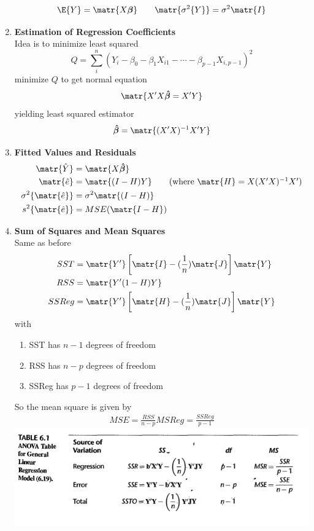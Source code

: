 \documentclass[11pt]{article}
\begin{document}
\begin{enumerate}
    \[
        \E\{Y\} =  \matr{X\boldsymbol{\beta}} \quad \quad \matr{\sigma^2\{Y\}} = \sigma^2 \matr{I}
    \]
    \item \textbf{Estimation of Regression Coefficients} \\
    Idea is to minimize least squared 
    \[
        Q = \sum_i^n (Y_i - \beta_0 - \beta_1 X_{i1} - \cdots - \beta_{p-1}X_{i, p-1})^2
    \]
    minimize $Q$ to get normal equation 
    \[
        \matr{X'X\boldsymbol{\hat{\beta}} = X'Y}
    \]
    yielding least squared estimator 
    \[
        \boldsymbol{\hat{\beta}} = \matr{(X'X)^{-1}X'Y}
    \]
    \item \textbf{Fitted Values and Residuals} \\
    \begin{align*}
        \matr{\hat{Y}} &= \matr{X\boldsymbol{\hat{\beta}}} \\ 
        \matr{\hat{e}} &= \matr{(I-H)Y} \tag{where $\matr{H} = X(X'X)^{-1}X'$}  \\
        \sigma^2\{\matr{\hat{e}}\} &= \sigma^2\matr{(I-H)} \\ 
        s^2\{\matr{\hat{e}}\} &= MSE(\matr{I-H}) \\ 
    \end{align*}
    \item \textbf{Sum of Squares and Mean Squares} \\
    Same as before 
    \begin{align*}
        SST &= \matr{Y'}\left[ \matr{I} - (\frac{1}{n})\matr{J} \right]\matr{Y}\\
        RSS &= \matr{Y'(1-H)Y}\\ 
        SSReg &= \matr{Y'}\left[ \matr{H} - (\frac{1}{n})\matr{J} \right]\matr{Y}\\
    \end{align*}
    with 
    \begin{enumerate}
        \item SST has $n-1$ degrees of freedom 
        \item RSS has $n-p$ degrees of freedom 
        \item SSReg has $p-1$ degrees of freedom
    \end{enumerate}
    So the mean square is given by
    \begin{align*}
        MSE = \frac{RSS}{n-p}
        MSReg = \frac{SSReg}{p-1}
    \end{align*}
    \includegraphics[width=\textwidth]{anova_table_for_GLR.png}

\end{enumerate}
\end{document}
